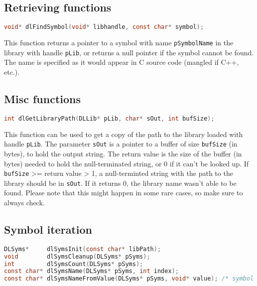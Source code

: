 \subsection{Retrieving functions}

\begin{lstlisting}[language=c]
void* dlFindSymbol(void* libhandle, const char* symbol);
\end{lstlisting}

This function returns a pointer to a symbol with name \lstinline{pSymbolName} in the
library with handle \lstinline{pLib}, or returns a null pointer if the symbol cannot
be found. The name is specified as it would appear in C source code (mangled if C++, etc.).

\subsection{Misc functions}
\begin{lstlisting}[language=c]
int dlGetLibraryPath(DLLib* pLib, char* sOut, int bufSize);
\end{lstlisting}

This function can be used to get a copy of the path to the library loaded with handle
\lstinline{pLib}. The parameter \lstinline{sOut} is a pointer to a buffer of size
\lstinline{bufSize} (in bytes), to hold the output string. The return value is the size
of the buffer (in bytes) needed to hold the null-terminated string, or 0 if it can't be
looked up. If \lstinline{bufSize} >= return value > 1, a null-terminted string with the
path to the library should be in \lstinline{sOut}.  If it returns 0, the library name wasn't
able to be found. Please note that this might happen in some rare cases, so make sure to always check.

\subsection{Symbol iteration}

\begin{lstlisting}[language=c]
DLSyms*     dlSymsInit(const char* libPath);
void        dlSymsCleanup(DLSyms* pSyms);
int         dlSymsCount(DLSyms* pSyms);
const char* dlSymsName(DLSyms* pSyms, int index);
const char* dlSymsNameFromValue(DLSyms* pSyms, void* value); /* symbol must be loaded */
\end{lstlisting}


